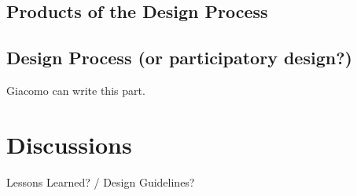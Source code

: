 \subsection{Products of the Design Process}

\subsection{Design Process (or participatory design?)}

\begin{svgraybox}
[note by GP] Giacomo can write this part. 

\end{svgraybox}


\section{Discussions}

\begin{svgraybox}
Lessons Learned?  / Design Guidelines? 
\end{svgraybox}